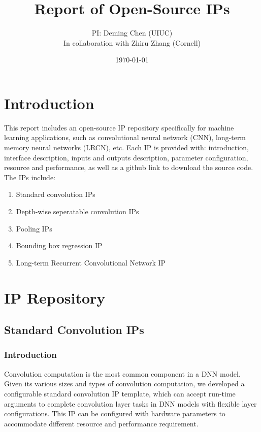\documentclass[a4paper, 11pt]{article}
\title{Report of Open-Source IPs}
\author{PI: Deming Chen (UIUC) \\ 
In collaboration with Zhiru Zhang (Cornell)}
\date{\today}
\begin{document}
\maketitle


\section{Introduction}
\label{sec:introduction}

This report includes an open-source IP repository specifically for machine learning applications, such as convolutional neural network (CNN), long-term memory neural networks (LRCN), etc.
Each IP is provided with: introduction, interface description, 
inputs and outputs description, parameter configuration, 
resource and performance, as well as a github link to download the source code.
The IPs include:
\begin{enumerate}
\itemsep-0.2em
    \item {Standard convolution IPs}
    \item {Depth-wise seperatable convolution IPs}
    \item {Pooling IPs}
    \item {Bounding box regression IP}
    \item {Long-term Recurrent Convolutional Network IP}
\end{enumerate}

\section{IP Repository\label{Sec: Cur_IP}}

\subsection{Standard Convolution IPs \label{Sec:Para_Conv}}

\subsubsection{Introduction}

Convolution computation is the most common component in a DNN model.
Given its various sizes and types of convolution computation,
we developed a configurable standard convolution IP template,
which can accept run-time arguments to complete convolution layer tasks in DNN models with flexible layer configurations.
This IP can be configured with hardware parameters to accommodate different resource and performance requirement.
\end{document}
